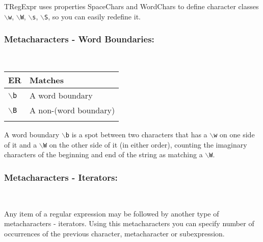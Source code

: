 TRegExpr uses properties SpaceChars and WordChars to define character
classes \texttt{$\backslash$w}, \texttt{$\backslash$W},
\texttt{$\backslash$s}, \texttt{$\backslash$S}, so you can easily
redefine it.


\subsubsection{Metacharacters - Word Boundaries:}\\

\begin{footnotesize}
  \begin{tabularx}{\textwidth}{>{\hsize=0.3\hsize}X>{\hsize=0.7\hsize}X}\\
    \hline
    \textbf{ER} & \textbf{Matches} \\
    \hline
    \texttt{$\backslash$b} & A word boundary \\
    \texttt{$\backslash$B} & A non-(word boundary) \\
    \hline
    \\
  \end{tabularx}
\end{footnotesize}

A word boundary \texttt{$\backslash$b} is a spot between two characters
that has a \texttt{$\backslash$w} on one side of it and a \texttt{$\backslash$W}
on the other side of it (in either order), counting the imaginary characters
of the beginning and end of the string as matching a \texttt{$\backslash$W}.


\subsubsection{Metacharacters - Iterators:}\\

Any item of a regular expression may be followed by another type of
metacharacters - iterators. Using this metacharacters you can specify
number of occurrences of the previous character, metacharacter or subexpression.

